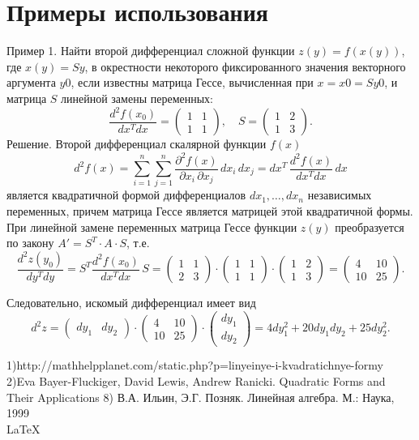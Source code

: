 \documentclass[bachelor, och, coursework, times]{SCWorks}
\newcommand\tab[1][1cm]{\hspace*{#1}}
\begin{document}
\section{Примеры использования}
\tab Пример 1. Найти второй дифференциал сложной функции $z(y)=f(x(y))$, где $x(y)=Sy$, в окрестности некоторого фиксированного значения векторного аргумента $y0$, если известны матрица Гессе, вычисленная при $x=x0=Sy0$, и матрица $S$
линейной замены переменных:
$$\frac{d^2f(x_0)}{dx^Tdx}
=\begin{pmatrix}
1&1\\
1&1
\end{pmatrix}\!,\quad 
S=
\begin{pmatrix}
1&2\\
1&3
\end{pmatrix}\!.$$
Решение. Второй дифференциал скалярной функции $f(x)$
$$d^2f(x)=\sum_{i=1}^{n}\sum_{j=1}^{n}\frac{\partial^2f(x)}{\partial x_i\,\partial x_j}\,dx_i\,dx_j= dx^T\,\frac{d^2f(x)}{dx^Tdx}\,dx$$
является квадратичной формой дифференциалов $dx_1,…,dx_n$
независимых переменных, причем матрица Гессе является матрицей этой квадратичной формы. При линейной замене переменных матрица Гессе функции $z(y)$ преобразуется по закону $A'=S^T\cdot A\cdot S$, т.е.
$$\frac{d^2z(y_0)}{dy^Tdy}= S^T\frac{d^2f(x_0)}{dx^Tdx}\,S= \begin{pmatrix}
1&1\\
2&3
\end{pmatrix}\!\cdot\! 
\begin{pmatrix}
1&1\\
1&1
\end{pmatrix}\!\cdot\! 
\begin{pmatrix} 
1&2\\
1&3
\end{pmatrix} = 
\begin{pmatrix} 
4&10\\
10&25
\end{pmatrix}\!.$$

Следовательно, искомый дифференциал имеет вид
$$d^2z=
\begin{pmatrix}
dy_1&dy_2
\end{pmatrix}\!\cdot\! 
\begin{pmatrix}
4&10\\
10&25 
\end{pmatrix}\!\cdot\! 
\begin{pmatrix}dy_1\\dy_2\end{pmatrix}= 4dy_1^2+20dy_1dy_2+25dy_2^2.$$




1)http://mathhelpplanet.com/static.php?p=linyeinye-i-kvadratichnye-formy
2)Eva Bayer-Fluckiger, David Lewis, Andrew Ranicki. Quadratic Forms and Their Applications
8) В.А. Ильин, Э.Г. Позняк. Линейная алгебра. М.: Наука, 1999
\\\LaTeX
\end{document}
